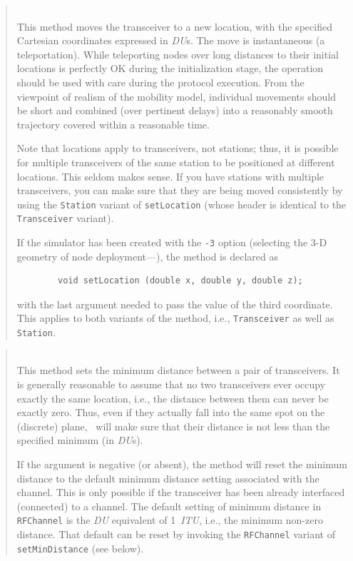 \begin{quote}
\noindent{} \hspace{0in}\vspace{0.05in}\\
\noindent
This method moves the transceiver to a new location, with the specified
Cartesian coordinates expressed in {\em DU\/}s.
The move is instantaneous (a teleportation).
While teleporting nodes over long distances to their initial locations
is perfectly OK during the initialization stage, the operation should be used
with care during the protocol execution.
From the viewpoint of realism of the mobility model, individual movements
should be short and combined (over pertinent delays) into a reasonably smooth
trajectory covered within a reasonable time.

\noindent
Note that locations apply to transceivers, not stations; thus, it is
possible for multiple transceivers of the same station to be positioned at
different locations.
This seldom makes sense.
If you have stations with multiple transceivers, you can make sure that they
are being moved consistently by using the {\tt Station} variant of
{\tt setLocation} (whose header is identical to the {\tt Transceiver} variant).

\noindent
If the simulator has been created with the {\tt -3} option (selecting the
3-D geometry of node deployment---), the method is
declared as
\begin{verbatim}
        void setLocation (double x, double y, double z);
\end{verbatim}
\noindent
with the last argument needed to pass the value of the third coordinate.
This applies to both variants of the method, i.e.,
{\tt Transceiver} as well as {\tt Station}.
\end{quote}

\begin{quote}
\noindent{} \hspace{0in}\vspace{0.05in}\\
\noindent
This method sets the minimum distance between a pair of transceivers.
It is generally reasonable to assume that no two transceivers ever
occupy exactly the same location, i.e., the distance between them can
never be exactly zero.
Thus, even if they actually fall into the same spot on the (discrete)
plane, \smurph\ will make sure that their distance is not less than the
specified minimum (in {\em DU\/}s).

\noindent
If the argument is negative (or absent), the method will reset
the minimum distance to the default minimum distance setting
associated with the channel.
This is only possible if the transceiver has been already interfaced (connected)
to a channel.
The default setting of minimum distance in {\tt RFChannel}
is the {\em DU\/} equivalent of
1~{\em ITU}, i.e., the minimum non-zero distance.
That default can be reset by invoking the {\tt RFChannel} variant of
{\tt setMinDistance} (see below).
\end{quote}

